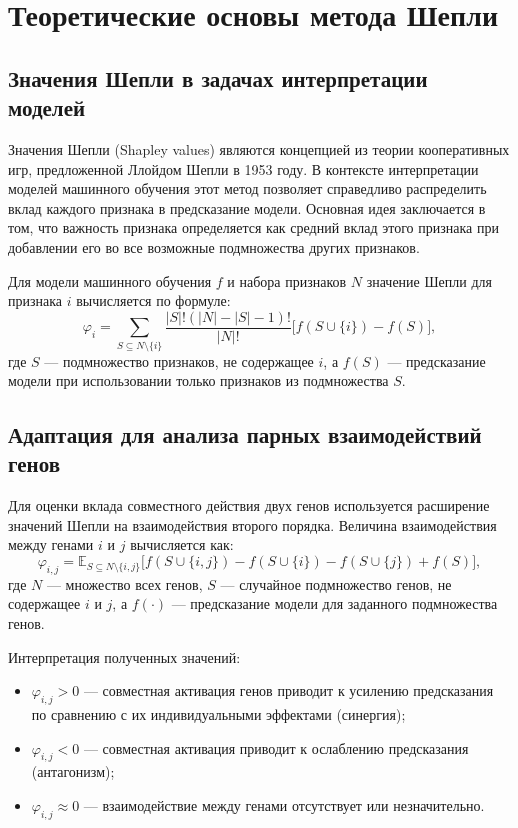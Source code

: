 \section{Теоретические основы метода Шепли}

\subsection{Значения Шепли в задачах интерпретации моделей}

Значения Шепли (Shapley values) являются концепцией из теории кооперативных 
игр, предложенной Ллойдом Шепли в 1953 году. \cite{Shapley1953} В контексте интерпретации 
моделей машинного обучения этот метод позволяет справедливо распределить 
вклад каждого признака в предсказание модели.\cite{Lundberg2017} Основная идея заключается 
в том, что важность признака определяется как средний вклад этого признака 
при добавлении его во все возможные подмножества других признаков.

Для модели машинного обучения $f$ и набора признаков $N$ значение Шепли 
для признака $i$ вычисляется по формуле:
\[
\varphi_i = \sum_{S \subseteq N \setminus \{i\}} \frac{|S|!(|N|-|S|-1)!}{|N|!} 
\bigl[f(S \cup \{i\}) - f(S)\bigr],
\]
где $S$ — подмножество признаков, не содержащее $i$, а $f(S)$ — предсказание 
модели при использовании только признаков из подмножества $S$.

\subsection{Адаптация для анализа парных взаимодействий генов}

Для оценки вклада совместного действия двух генов используется расширение 
значений Шепли на взаимодействия второго порядка.\cite{Cui2022} Величина взаимодействия 
между генами $i$ и $j$ вычисляется как:
\[
\varphi_{i,j} = \mathbb{E}_{S \subseteq N \setminus \{i,j\}} 
\bigl[f(S \cup \{i,j\}) - f(S \cup \{i\}) - f(S \cup \{j\}) + f(S)\bigr],
\]
где $N$ — множество всех генов, $S$ — случайное подмножество генов, 
не содержащее $i$ и $j$, а $f(\cdot)$ — предсказание модели для заданного 
подмножества генов.

Интерпретация полученных значений:
\begin{itemize}
	\item $\varphi_{i,j} > 0$ — совместная активация генов приводит к 
	усилению предсказания по сравнению с их индивидуальными эффектами 
	(синергия);
	\item $\varphi_{i,j} < 0$ — совместная активация приводит к 
	ослаблению предсказания (антагонизм);
	\item $\varphi_{i,j} \approx 0$ — взаимодействие между генами 
	отсутствует или незначительно.
\end{itemize}

